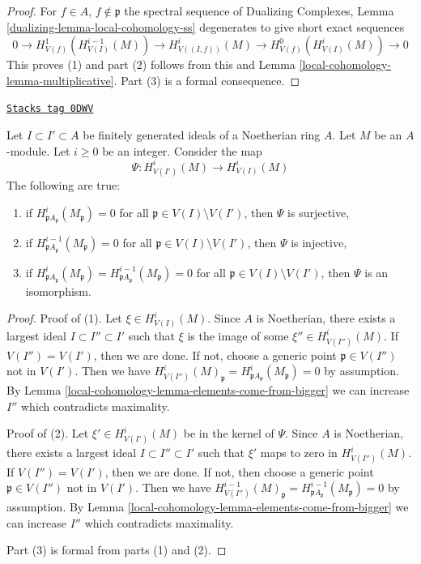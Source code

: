 \begin{proof}
For $f \in A$, $f \not \in \mathfrak p$ the spectral sequence of
Dualizing Complexes, Lemma \ref{dualizing-lemma-local-cohomology-ss}
degenerates to give short exact sequences
$$
0 \to H^1_{V(f)}(H^{i - 1}_{V(I)}(M)) \to
H^i_{V((I, f))}(M) \to H^0_{V(f)}(H^i_{V(I)}(M)) \to 0
$$
This proves (1) and part (2) follows from this and
Lemma \ref{local-cohomology-lemma-multiplicative}.
Part (3) is a formal consequence.
\end{proof}

\begin{lemma}[Isomorphism]
\label{local-cohomology-lemma-isomorphism}
\href{https://stacks.math.columbia.edu/tag/0DWV}{\texttt{Stacks tag 0DWV}}

Let $I \subset I' \subset A$ be finitely generated ideals of a
Noetherian ring $A$. Let $M$ be an $A$-module. Let $i \geq 0$ be an integer.
Consider the map
$$
\Psi : H^i_{V(I')}(M) \to H^i_{V(I)}(M)
$$
The following are true:
\begin{enumerate}
\item if $H^i_{\mathfrak pA_\mathfrak p}(M_\mathfrak p) = 0$
for all $\mathfrak p \in V(I) \setminus V(I')$, then
$\Psi$ is surjective,
\item if $H^{i - 1}_{\mathfrak pA_\mathfrak p}(M_\mathfrak p) = 0$
for all $\mathfrak p \in V(I) \setminus V(I')$, then
$\Psi$ is injective,
\item if $H^i_{\mathfrak pA_\mathfrak p}(M_\mathfrak p) =
H^{i - 1}_{\mathfrak pA_\mathfrak p}(M_\mathfrak p) = 0$
for all $\mathfrak p \in V(I) \setminus V(I')$, then
$\Psi$ is an isomorphism.
\end{enumerate}
\end{lemma}

\begin{proof}
Proof of (1).
Let $\xi \in H^i_{V(I)}(M)$. Since $A$ is Noetherian, there exists a
largest ideal $I \subset I'' \subset I'$ such that $\xi$ is the image
of some $\xi'' \in H^i_{V(I'')}(M)$. If $V(I'') = V(I')$, then we are
done. If not, choose a generic point $\mathfrak p \in V(I'')$ not in $V(I')$.
Then we have $H^i_{V(I'')}(M)_\mathfrak p =
H^i_{\mathfrak pA_\mathfrak p}(M_\mathfrak p) = 0$ by assumption.
By Lemma \ref{local-cohomology-lemma-elements-come-from-bigger} we can increase $I''$
which contradicts maximality.

\medskip\noindent
Proof of (2). Let $\xi' \in H^i_{V(I')}(M)$ be in the kernel of $\Psi$.
Since $A$ is Noetherian, there exists a
largest ideal $I \subset I'' \subset I'$ such that $\xi'$
maps to zero in $H^i_{V(I'')}(M)$. If $V(I'') = V(I')$, then we are
done. If not, then choose a generic point $\mathfrak p  \in V(I'')$
not in $V(I')$. Then we have $H^{i - 1}_{V(I'')}(M)_\mathfrak p =
H^{i - 1}_{\mathfrak pA_\mathfrak p}(M_\mathfrak p) = 0$ by assumption.
By Lemma \ref{local-cohomology-lemma-elements-come-from-bigger} we can increase $I''$
which contradicts maximality.

\medskip\noindent
Part (3) is formal from parts (1) and (2).
\end{proof}

